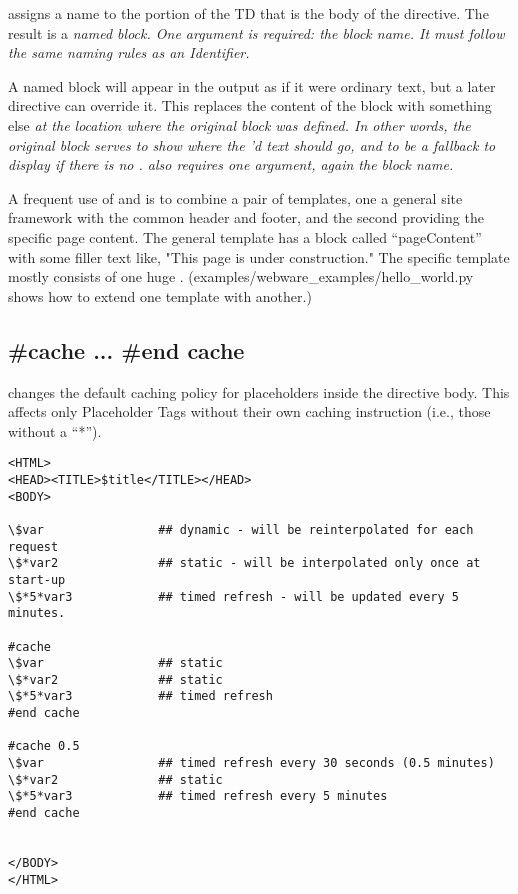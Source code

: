  assigns a name to the portion of the TD that is the body of the
directive.   The result is a \em{named block}.  One argument is required: the
block name.  It must follow
the same naming rules as an Identifier.

A named block will appear in the output as if it were ordinary text, but a
later  directive can override it.  This replaces the content of
the block with something else \em{at the location where the original block was
defined}.  In other words, the original block serves to show \em{where} the
'd text should go, and to be a fallback to display if there is
no .   also requires one argument, again the
block name.

A frequent use of  and  is to combine a pair of
templates, one a general site framework with the common header and footer, and
the second providing the specific page content.  The general template has a
block called ``pageContent'' with some filler text like, "This page is under
construction."  The specific template mostly consists of one huge
.  (examples/webware\_examples/hello\_world.py shows how to
extend one template with another.)



\subsection{\#cache ... \#end cache}

 changes the default caching policy for placeholders inside the
directive body.  This affects only Placeholder Tags without their own caching
instruction (i.e., those without a ``*'').

\begin{verbatim}
<HTML>
<HEAD><TITLE>$title</TITLE></HEAD>
<BODY>

\$var                ## dynamic - will be reinterpolated for each request
\$*var2              ## static - will be interpolated only once at start-up
\$*5*var3            ## timed refresh - will be updated every 5 minutes.

#cache
\$var                ## static
\$*var2              ## static
\$*5*var3            ## timed refresh
#end cache

#cache 0.5
\$var                ## timed refresh every 30 seconds (0.5 minutes)
\$*var2              ## static
\$*5*var3            ## timed refresh every 5 minutes
#end cache


</BODY>
</HTML>
\end{verbatim}


